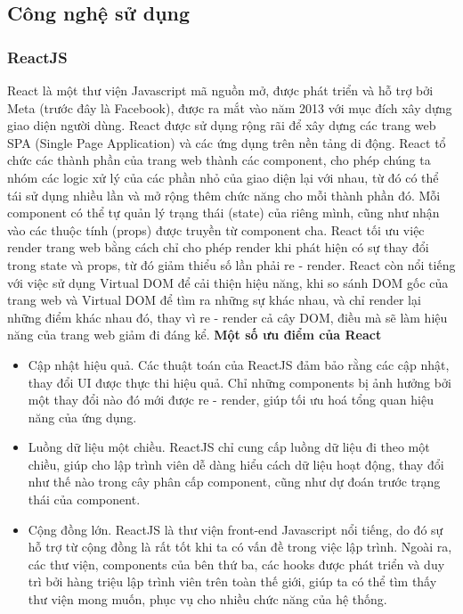 \subsection{Công nghệ sử dụng}
\subsubsection{ReactJS}
React là một thư viện Javascript mã nguồn mở, được phát triển và hỗ trợ bởi Meta (trước đây là Facebook), được ra mắt vào năm 2013 với mục đích xây dựng giao diện người dùng. React được sử dụng rộng rãi để xây dựng các trang web SPA (Single Page Application) và các ứng dụng trên nền tảng di động. React tổ chức các thành phần của trang web thành các component, cho phép chúng ta nhóm các logic xử lý của các phần nhỏ của giao diện lại với nhau, từ đó có thể tái sử dụng nhiều lần và mở rộng thêm chức năng cho mỗi thành phần đó. Mỗi component có thể tự quản lý trạng thái (state) của riêng mình, cũng như nhận vào các thuộc tính (props) được truyền từ component cha. React tối ưu việc render trang web bằng cách chỉ cho phép render khi phát hiện có sự thay đổi trong state và props, từ đó giảm thiểu số lần phải re - render. React còn nổi tiếng với việc sử dụng Virtual DOM để cải thiện hiệu năng, khi so sánh DOM gốc của trang web và Virtual DOM để tìm ra những sự khác nhau, và chỉ render lại những điểm khác nhau đó, thay vì re - render cả cây DOM, điều mà sẽ làm hiệu năng của trang web giảm đi đáng kể.
\newline
\textbf{Một số ưu điểm của React}
\begin{itemize}
    \item Cập nhật hiệu quả. Các thuật toán của ReactJS đảm bảo rằng các cập nhật, thay đổi UI được thực thi hiệu quả. Chỉ những components bị ảnh hưởng bởi một thay đổi nào đó mới được re - render, giúp tối ưu hoá tổng quan hiệu năng của ứng dụng.
    \item Luồng dữ liệu một chiều. ReactJS chỉ cung cấp luồng dữ liệu đi theo một chiều, giúp cho lập trình viên dễ dàng hiểu cách dữ liệu hoạt động, thay đổi như thế nào trong cây phân cấp component, cũng như dự đoán trước trạng thái của component.
    \item Cộng đồng lớn. ReactJS là thư viện front-end Javascript nổi tiếng, do đó sự hỗ trợ từ cộng đồng là rất tốt khi ta có vấn đề trong việc lập trình. Ngoài ra, các thư viện, components của bên thứ ba, các hooks được phát triển và duy trì bởi hàng triệu lập trình viên trên toàn thế giới, giúp ta có thể tìm thấy thư viện mong muốn, phục vụ cho nhiều chức năng của hệ thống.
\end{itemize}
